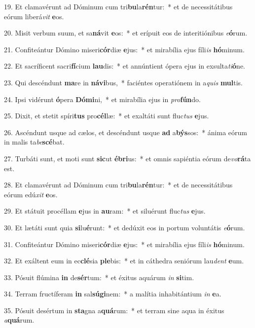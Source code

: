 19. Et clamavérunt ad Dóminum cum tri\textbf{bu}la\textbf{rén}tur:~*  et de necessitátibus eórum liberá\textit{vit} \textbf{e}os.\

20. Misit verbum suum, et sa\textbf{ná}vit \textbf{e}os:~*  et erípuit eos de interitiónibus \textit{e}\textbf{ó}rum.\

21. Confiteántur Dómino miseri\textbf{cór}diæ \textbf{e}jus:~*  et mirabília ejus fíli\textit{is} \textbf{hó}minum.\

22. Et sacríficent sacri\textbf{fí}cium \textbf{lau}dis:~*  et annúntient ópera ejus in exsulta\textit{ti}\textbf{ó}ne.\

23. Qui descéndunt \textbf{ma}re in \textbf{ná}\textbf{vi}bus,~*  faciéntes operatiónem in a\textit{quis} \textbf{mul}tis.\

24. Ipsi vidérunt \textbf{ó}pera \textbf{Dó}\textbf{mi}ni,~*  et mirabília ejus in \textit{pro}\textbf{fún}do.\

25. Dixit, et stetit spíri\textbf{tus} pro\textbf{cél}læ:~*  et exaltáti sunt fluc\textit{tus} \textbf{e}jus.\

26. Ascéndunt usque ad cælos, et descéndunt usque \textbf{ad} a\textbf{býs}sos:~*  ánima eórum in malis ta\textit{be}\textbf{scé}bat.\

27. Turbáti sunt, et moti sunt \textbf{sic}ut \textbf{é}\textbf{bri}us:~*  et omnis sapiéntia eórum de\textit{vo}\textbf{rá}ta est.\

28. Et clamavérunt ad Dóminum cum tri\textbf{bu}la\textbf{rén}tur:~*  et de necessitátibus eórum edú\textit{xit} \textbf{e}os.\

29. Et státuit procéllam \textbf{e}jus in \textbf{au}ram:~*  et siluérunt fluc\textit{tus} \textbf{e}jus.\

30. Et lætáti sunt quia \textbf{si}lu\textbf{é}runt:~*  et dedúxit eos in portum voluntátis \textit{e}\textbf{ó}rum.\

31. Confiteántur Dómino miseri\textbf{cór}diæ \textbf{e}jus:~*  et mirabília ejus fíli\textit{is} \textbf{hó}minum.\

32. Et exáltent eum in ec\textbf{clé}sia \textbf{ple}bis:~*  et in cáthedra seniórum lau\textit{dent} \textbf{e}um.\

33. Pósuit flúmina \textbf{in} de\textbf{sér}tum:~*  et éxitus aquárum \textit{in} \textbf{si}tim.\

34. Terram fructíferam \textbf{in} sal\textbf{sú}\textbf{gi}nem:~*  a malítia inhabitántium \textit{in} \textbf{e}a.\

35. Pósuit desértum in \textbf{sta}gna a\textbf{quá}rum:~*  et terram sine aqua in éxitus \textit{a}\textbf{quá}rum.\


